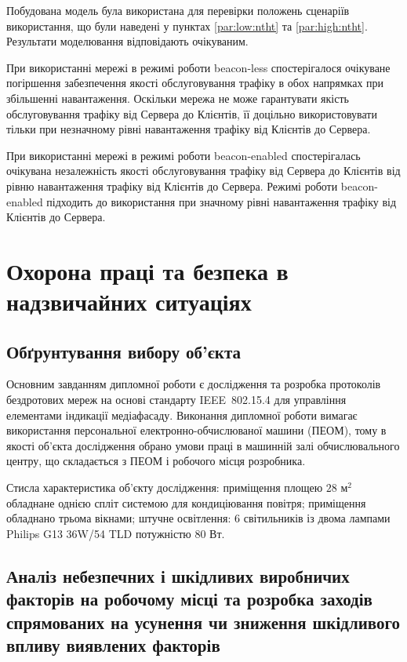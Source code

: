 \documentclass[a4paper,ukrainian,utf8,nocolumnsxix,floatsection,equationsection]{eskdtext}
\newcommand{\iee}[0]{IEEE~802.15.4\xspace}
\newcommand{\blm}[0]{beacon-less\xspace}
\newcommand{\bem}[0]{beacon-enabled\xspace}
\begin{document}
Побудована модель була використана для перевірки положень сценаріїв використання, що були наведені у пунктах \ref{par:low:ntht} та \ref{par:high:ntht}. Результати моделювання відповідають очікуваним.

При використанні мережі в режимі роботи \blm спостерігалося очікуване погіршення забезпечення якості обслуговування трафіку в обох напрямках при збільшенні навантаження. Оскільки мережа не може гарантувати якість обслуговування трафіку від Сервера до Клієнтів, її доцільно використовувати тільки при незначному рівні навантаження трафіку від Клієнтів до Сервера.

При використанні мережі в режимі роботи \bem спостерігалась очікувана незалежність якості обслуговування трафіку від Сервера до Клієнтів від  рівню навантаження трафіку від Клієнтів до Сервера. Режимі роботи \bem підходить до використання при значному рівні навантаження трафіку від Клієнтів до Сервера.

\section{Охорона праці та безпека в надзвичайних ситуаціях}
\label{sec:work_safety}

\subsection{Обґрунтування вибору об'єкта}

Основним завданням дипломної роботи є дослідження та розробка протоколів бездротових мереж на основі стандарту \iee для управління елементами індикації медіафасаду. Виконання дипломної роботи вимагає використання персональної електронно-обчислюваної машини (ПЕОМ), тому в якості об'єкта дослідження обрано умови праці в машинній залі обчислювального центру, що складається з ПЕОМ і робочого місця розробника.

Стисла характеристика об'єкту дослідження: приміщення площею $28 \text{ м}^2$ обладнане однією спліт системою для кондиціювання повітря; приміщення обладнано трьома вікнами; штучне освітлення: 6 світильників із двома лампами Philips G13 36W/54 TLD потужністю 80 Вт.


\subsection{Аналіз небезпечних і шкідливих виробничих факторів на робочому місці та розробка заходів спрямованих на усунення чи зниження шкідливого впливу виявлених факторів}
\end{document}
